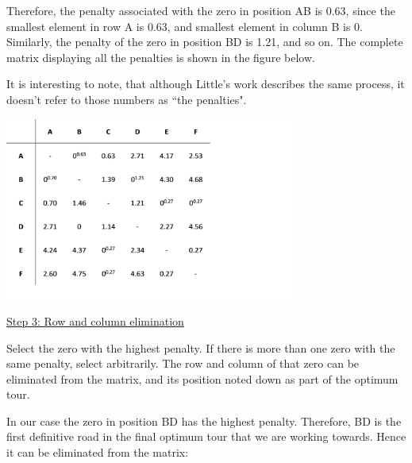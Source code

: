 \vspace{5mm}

Therefore, the penalty associated with the zero in position AB is 0.63, since the smallest element in row A is 0.63, and smallest element in column B is 0. Similarly, the penalty of the zero in position BD is 1.21, and so on. The complete matrix displaying all the penalties is shown in the figure below.	
\vspace{5mm}
	
	
It is interesting to note, that although Little’s work describes the same process, it doesn’t refer to those numbers as “the penalties".
	
\includegraphics[height=6cm]{dmpenalties}
	

\vspace{5mm}

\noindent
\underline{Step 3: Row and column elimination}
\vspace{1mm}

\noindent
Select the zero with the highest penalty. If there is more than one zero with the same penalty, select arbitrarily. The row and column of that zero can be eliminated from the matrix, and its position noted down as part of the optimum tour.

\vspace{5mm}

In our case the zero in position BD has the highest penalty. Therefore, BD is the first definitive road in the final optimum tour that we are working towards. Hence it can be eliminated from the matrix:

\vspace{3mm}

